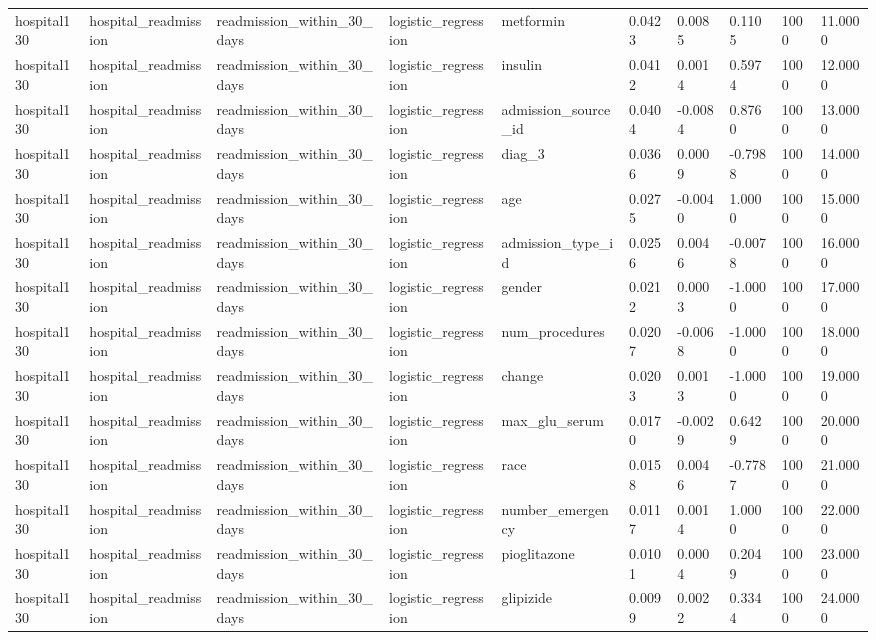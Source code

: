 \begin{tabular}{llllllllll}
hospital130 & hospital\_readmission & readmission\_within\_30\_days & logistic\_regression & metformin & 0.0423 & 0.0085 & 0.1105 & 1000 & 11.0000 \\
hospital130 & hospital\_readmission & readmission\_within\_30\_days & logistic\_regression & insulin & 0.0412 & 0.0014 & 0.5974 & 1000 & 12.0000 \\
hospital130 & hospital\_readmission & readmission\_within\_30\_days & logistic\_regression & admission\_source\_id & 0.0404 & -0.0084 & 0.8760 & 1000 & 13.0000 \\
hospital130 & hospital\_readmission & readmission\_within\_30\_days & logistic\_regression & diag\_3 & 0.0366 & 0.0009 & -0.7988 & 1000 & 14.0000 \\
hospital130 & hospital\_readmission & readmission\_within\_30\_days & logistic\_regression & age & 0.0275 & -0.0040 & 1.0000 & 1000 & 15.0000 \\
hospital130 & hospital\_readmission & readmission\_within\_30\_days & logistic\_regression & admission\_type\_id & 0.0256 & 0.0046 & -0.0078 & 1000 & 16.0000 \\
hospital130 & hospital\_readmission & readmission\_within\_30\_days & logistic\_regression & gender & 0.0212 & 0.0003 & -1.0000 & 1000 & 17.0000 \\
hospital130 & hospital\_readmission & readmission\_within\_30\_days & logistic\_regression & num\_procedures & 0.0207 & -0.0068 & -1.0000 & 1000 & 18.0000 \\
hospital130 & hospital\_readmission & readmission\_within\_30\_days & logistic\_regression & change & 0.0203 & 0.0013 & -1.0000 & 1000 & 19.0000 \\
hospital130 & hospital\_readmission & readmission\_within\_30\_days & logistic\_regression & max\_glu\_serum & 0.0170 & -0.0029 & 0.6429 & 1000 & 20.0000 \\
hospital130 & hospital\_readmission & readmission\_within\_30\_days & logistic\_regression & race & 0.0158 & 0.0046 & -0.7787 & 1000 & 21.0000 \\
hospital130 & hospital\_readmission & readmission\_within\_30\_days & logistic\_regression & number\_emergency & 0.0117 & 0.0014 & 1.0000 & 1000 & 22.0000 \\
hospital130 & hospital\_readmission & readmission\_within\_30\_days & logistic\_regression & pioglitazone & 0.0101 & 0.0004 & 0.2049 & 1000 & 23.0000 \\
hospital130 & hospital\_readmission & readmission\_within\_30\_days & logistic\_regression & glipizide & 0.0099 & 0.0022 & 0.3344 & 1000 & 24.0000 \\

\end{tabular}
